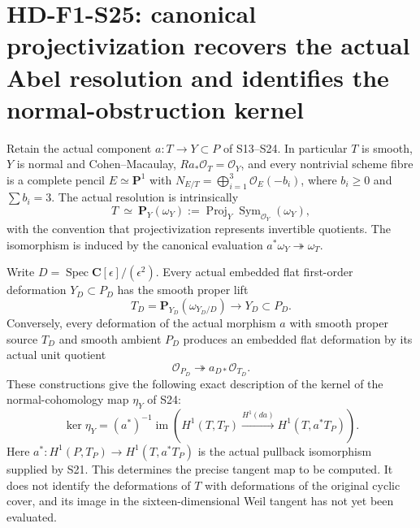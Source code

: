 \section[HD-F1-S25: the intrinsic resolution and its actual deformation maps]{HD-F1-S25: canonical projectivization recovers the actual Abel resolution and identifies the normal-obstruction kernel}
\label{sec:f1-norm-fourfold-canonical-resolution}

Retain the actual component $a:T\to Y\subset P$ of S13--S24.
In particular $T$ is smooth, $Y$ is normal and Cohen--Macaulay,
$Ra_*\mathcal O_T=\mathcal O_Y$, and every nontrivial scheme
fibre is a complete pencil $E\simeq\mathbf P^1$ with
$N_{E/T}=\bigoplus_{i=1}^3\mathcal O_E(-b_i)$, where
$b_i\geq0$ and $\sum b_i=3$. The actual resolution is intrinsically
\[
 T\ \simeq\ \mathbf P_Y(\omega_Y)
       :=\operatorname{Proj}_Y\operatorname{Sym}_{\mathcal O_Y}(\omega_Y),
 \tag{F1S25.1}
\]
with the convention that projectivization represents invertible
quotients. The isomorphism is induced by the canonical evaluation
$a^*\omega_Y\twoheadrightarrow\omega_T$.

Write $D=\operatorname{Spec}\mathbf C[\epsilon]/(\epsilon^2)$.
Every actual embedded flat first-order deformation
$Y_D\subset P_D$ has the smooth proper lift
\[
 T_D=\mathbf P_{Y_D}(\omega_{Y_D/D})\longrightarrow Y_D\subset P_D.
 \tag{F1S25.2}
\]
Conversely, every deformation of the actual morphism $a$ with smooth
proper source $T_D$ and smooth ambient $P_D$ produces an embedded
flat deformation by its actual unit quotient
\[
 \mathcal O_{P_D}\twoheadrightarrow a_{D*}\mathcal O_{T_D}.
 \tag{F1S25.3}
\]
These constructions give the following exact description of the
kernel of the normal-cohomology map $\eta_Y$ of S24:
\[
 \ker\eta_Y
  =(a^*)^{-1}\operatorname{im}\left(
    H^1(T,T_T)\xrightarrow{H^1(da)}H^1(T,a^*T_P)\right).
 \tag{F1S25.4}
\]
Here $a^*:H^1(P,T_P)\to H^1(T,a^*T_P)$ is the actual pullback
isomorphism supplied by S21. This determines the precise tangent
map to be computed. It does not identify the deformations of $T$
with deformations of the original cyclic cover, and its image in
the sixteen-dimensional Weil tangent has not yet been evaluated.

